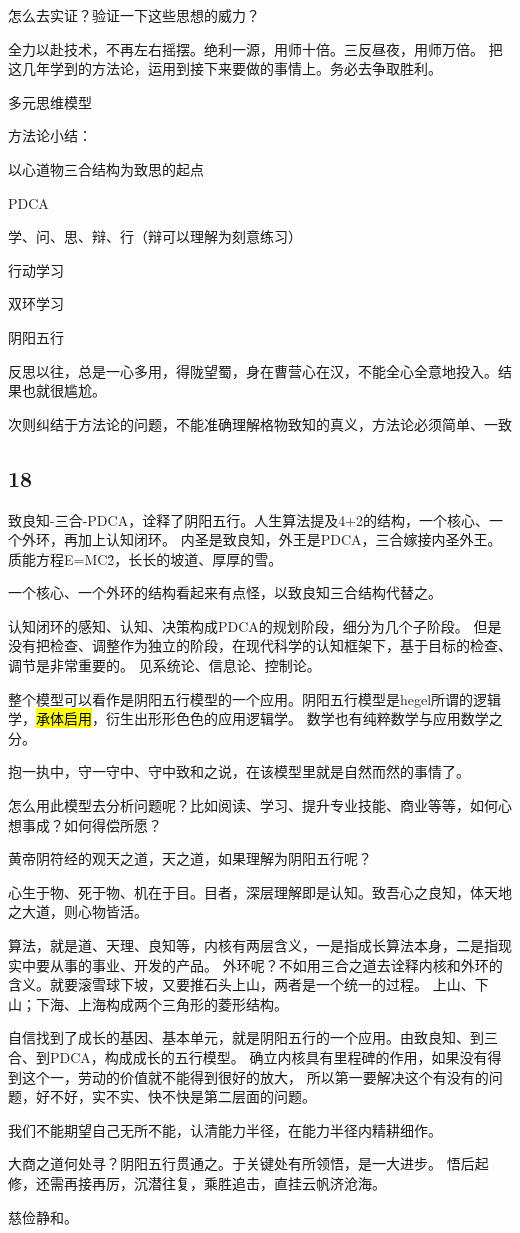 怎么去实证？验证一下这些思想的威力？

全力以赴技术，不再左右摇摆。绝利一源，用师十倍。三反昼夜，用师万倍。
把这几年学到的方法论，运用到接下来要做的事情上。务必去争取胜利。

多元思维模型

方法论小结：
\begin{enumbox}
\item 以心道物三合结构为致思的起点
\item PDCA
\item 学、问、思、辩、行（辩可以理解为刻意练习）
\item 行动学习
\item 双环学习
\item 阴阳五行
\end{enumbox}

反思以往，总是一心多用，得陇望蜀，身在曹营心在汉，不能全心全意地投入。结果也就很尴尬。

次则纠结于方法论的问题，不能准确理解格物致知的真义，方法论必须简单、一致

\subsection{18}

致良知-三合-PDCA，诠释了阴阳五行。人生算法提及4+2的结构，一个核心、一个外环，再加上认知闭环。
内圣是致良知，外王是PDCA，三合嫁接内圣外王。质能方程E=MC\^2，长长的坡道、厚厚的雪。

一个核心、一个外环的结构看起来有点怪，以致良知三合结构代替之。

认知闭环的感知、认知、决策构成PDCA的规划阶段，细分为几个子阶段。
但是没有把检查、调整作为独立的阶段，在现代科学的认知框架下，基于目标的检查、调节是非常重要的。
见系统论、信息论、控制论。

整个模型可以看作是阴阳五行模型的一个应用。阴阳五行模型是hegel所谓的逻辑学，\hl{承体启用}，衍生出形形色色的应用逻辑学。
数学也有纯粹数学与应用数学之分。

抱一执中，守一守中、守中致和之说，在该模型里就是自然而然的事情了。

怎么用此模型去分析问题呢？比如阅读、学习、提升专业技能、商业等等，如何心想事成？如何得偿所愿？

黄帝阴符经的观天之道，天之道，如果理解为阴阳五行呢？

心生于物、死于物、机在于目。目者，深层理解即是认知。致吾心之良知，体天地之大道，则心物皆活。

算法，就是道、天理、良知等，内核有两层含义，一是指成长算法本身，二是指现实中要从事的事业、开发的产品。
外环呢？不如用三合之道去诠释内核和外环的含义。就要滚雪球下坡，又要推石头上山，两者是一个统一的过程。
上山、下山；下海、上海构成两个三角形的菱形结构。

自信找到了成长的基因、基本单元，就是阴阳五行的一个应用。由致良知、到三合、到PDCA，构成成长的五行模型。
确立内核具有里程碑的作用，如果没有得到这个一，劳动的价值就不能得到很好的放大，
所以第一要解决这个有没有的问题，好不好，实不实、快不快是第二层面的问题。

我们不能期望自己无所不能，认清能力半径，在能力半径内精耕细作。

大商之道何处寻？阴阳五行贯通之。于关键处有所领悟，是一大进步。
悟后起修，还需再接再厉，沉潜往复，乘胜追击，直挂云帆济沧海。

慈俭静和。
